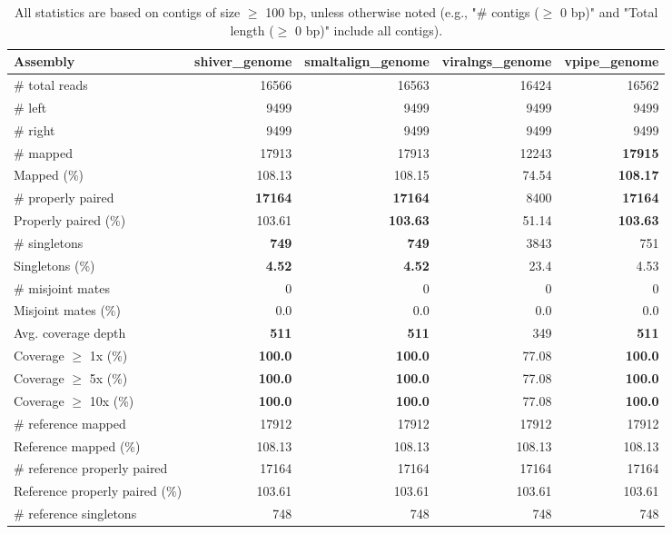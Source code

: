 \documentclass[12pt,a4paper]{article}
\begin{document}
\begin{table}[ht]
\begin{center}
\caption{All statistics are based on contigs of size $\geq$ 100 bp, unless otherwise noted (e.g., "\# contigs ($\geq$ 0 bp)" and "Total length ($\geq$ 0 bp)" include all contigs).}
\begin{tabular}{|l*{4}{|r}|}
\hline
Assembly & shiver\_genome & smaltalign\_genome & viralngs\_genome & vpipe\_genome \\ \hline
\# total reads & 16566 & 16563 & 16424 & 16562 \\ \hline
\# left & 9499 & 9499 & 9499 & 9499 \\ \hline
\# right & 9499 & 9499 & 9499 & 9499 \\ \hline
\# mapped & 17913 & 17913 & 12243 & {\bf 17915} \\ \hline
Mapped (\%) & 108.13 & 108.15 & 74.54 & {\bf 108.17} \\ \hline
\# properly paired & {\bf 17164} & {\bf 17164} & 8400 & {\bf 17164} \\ \hline
Properly paired (\%) & 103.61 & {\bf 103.63} & 51.14 & {\bf 103.63} \\ \hline
\# singletons & {\bf 749} & {\bf 749} & 3843 & 751 \\ \hline
Singletons (\%) & {\bf 4.52} & {\bf 4.52} & 23.4 & 4.53 \\ \hline
\# misjoint mates & 0 & 0 & 0 & 0 \\ \hline
Misjoint mates (\%) & 0.0 & 0.0 & 0.0 & 0.0 \\ \hline
Avg. coverage depth & {\bf 511} & {\bf 511} & 349 & {\bf 511} \\ \hline
Coverage $\geq$ 1x (\%) & {\bf 100.0} & {\bf 100.0} & 77.08 & {\bf 100.0} \\ \hline
Coverage $\geq$ 5x (\%) & {\bf 100.0} & {\bf 100.0} & 77.08 & {\bf 100.0} \\ \hline
Coverage $\geq$ 10x (\%) & {\bf 100.0} & {\bf 100.0} & 77.08 & {\bf 100.0} \\ \hline
\# reference mapped & 17912 & 17912 & 17912 & 17912 \\ \hline
Reference mapped (\%) & 108.13 & 108.13 & 108.13 & 108.13 \\ \hline
\# reference properly paired & 17164 & 17164 & 17164 & 17164 \\ \hline
Reference properly paired (\%) & 103.61 & 103.61 & 103.61 & 103.61 \\ \hline
\# reference singletons & 748 & 748 & 748 & 748 \\ \hline

\end{tabular}
\end{center}
\end{table}
\end{document}
